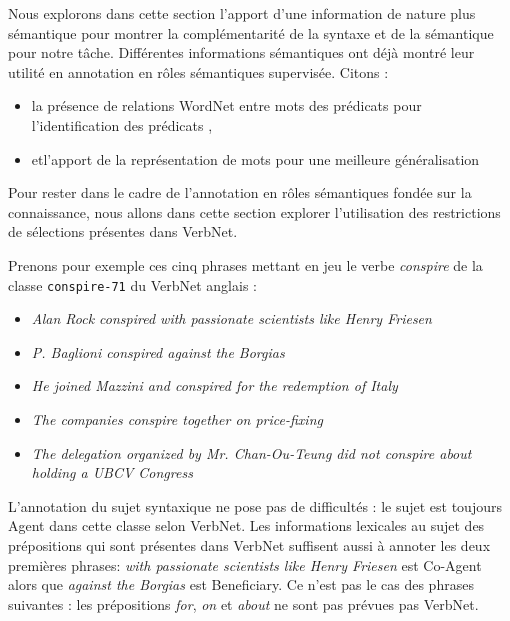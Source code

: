 Nous explorons dans cette section l'apport d'une information de nature plus
sémantique pour montrer la complémentarité de la syntaxe et de la sémantique
pour notre tâche. Différentes informations sémantiques ont déjà montré leur
utilité en annotation en rôles sémantiques supervisée. Citons :

\begin{itemize}
    \item la présence de relations WordNet entre mots des prédicats pour
        l'identification des prédicats \citep{das2010probabilistic},
    \item etl'apport de la représentation de mots pour une meilleure
        généralisation \citep{lechelle2014utilisation}
\end{itemize}

Pour rester dans le cadre de l'annotation en rôles sémantiques fondée sur la
connaissance, nous allons dans cette section explorer l'utilisation des
restrictions de sélections présentes dans VerbNet.


Prenons pour exemple ces cinq phrases mettant en jeu le verbe
\emph{conspire} de la classe \texttt{conspire-71} du VerbNet anglais :

\begin{itemize}
    \item \emph{Alan Rock conspired with passionate scientists like Henry Friesen}
    \item \emph{P. Baglioni conspired against the Borgias}
    \item \emph{He joined Mazzini and conspired for the redemption of Italy}
    \item \emph{The companies conspire together on price-fixing}
    \item \emph{The delegation organized by Mr. Chan-Ou-Teung did not conspire about holding a UBCV Congress}
\end{itemize}

L'annotation du sujet syntaxique ne pose pas de difficultés : le sujet est
toujours Agent dans cette classe selon VerbNet. Les informations lexicales au
sujet des prépositions qui sont présentes dans VerbNet suffisent aussi à
annoter les deux premières phrases: \emph{with passionate scientists like Henry
Friesen} est Co-Agent alors que \emph{against the Borgias} est Beneficiary. Ce
n'est pas le cas des phrases suivantes : les prépositions \emph{for}, \emph{on}
et \emph{about} ne sont pas prévues pas VerbNet.


